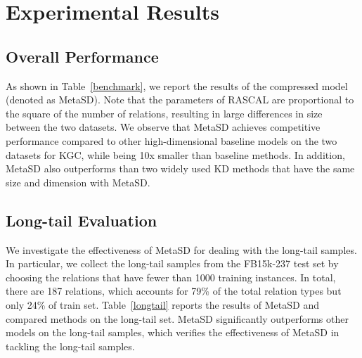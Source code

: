 \documentclass[11pt]{article}
\begin{document}
\section{Experimental Results}
\subsection{Overall Performance}
As shown in Table~\ref{benchmark}, we report the results of the compressed model (denoted as MetaSD). Note that the parameters of RASCAL are proportional to the square of the number of relations, resulting in large differences in size between the two datasets. We observe that MetaSD achieves competitive performance compared to other high-dimensional baseline models on the two datasets for KGC, while being 10x smaller than baseline methods. 
In addition, MetaSD also outperforms than two widely used KD methods that have the same size and dimension with MetaSD.

\subsection{Long-tail Evaluation}
We investigate the effectiveness of MetaSD for dealing with the long-tail samples. In particular, we collect the long-tail samples from the FB15k-237 test set by choosing the relations that have fewer than 1000 training instances. In total, there are 187 relations, which accounts for 79\% of the total relation types but only 24\% of train set.  Table~\ref{longtail} reports the results of MetaSD and compared methods on the long-tail set. MetaSD significantly outperforms other models on the long-tail samples, which verifies the effectiveness of MetaSD in tackling the long-tail samples. 
\begin{table}
\centering
{}
\caption{\label{longtail}
Results on long-tail data from FB15k-237.
}
\end{table}
\end{document}
